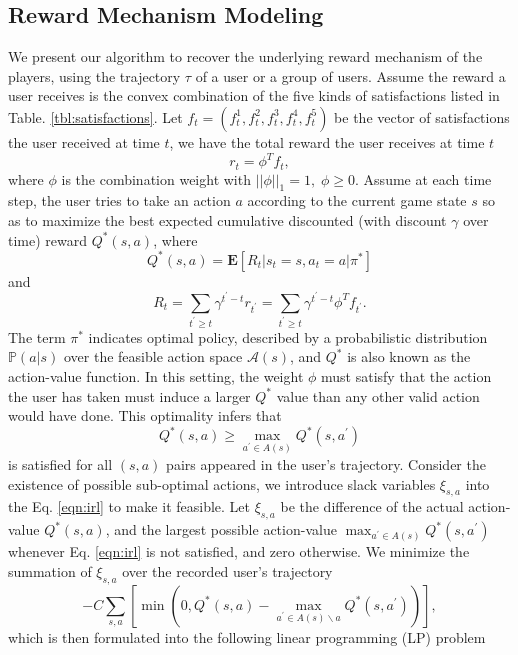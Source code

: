 \documentclass{sigchi}
\begin{document}
\subsection{Reward Mechanism Modeling}

We present our algorithm to recover the underlying reward mechanism of the players, using the trajectory $\tau$ of a user or a group of users.
Assume the reward a user receives is the convex combination of the five kinds of satisfactions listed in Table. \ref{tbl:satisfactions}.
Let $f_t=(f_t^1,f_t^2,f_t^3,f_t^4,f_t^5)$ be the vector of satisfactions the user received at time $t$, we have the total reward the user receives at time $t$
\begin{equation*}
r_t=\phi^Tf_t,
\end{equation*}
where $\phi$ is the combination weight with $||\phi||_1=1, \; \phi \geq 0$.
Assume at each time step, the user tries to take an action $a$ according to the current game state $s$ so as to maximize the best expected cumulative discounted (with discount $\gamma$ over time) reward $Q^\ast(s, a)$, where
$$Q^\ast(s,a)=\mathbf{E}[R_t | s_{t}=s, a_{t}=a | \pi^\ast]$$
and
$$R_t=\sum_{t^\prime\geq t}\gamma^{t^\prime-t}r_{t^\prime}=\sum_{t^\prime\geq t}\gamma^{t^\prime-t}\phi^Tf_{t^\prime}.$$
The term $\pi^\ast$ indicates optimal policy, described by a probabilistic distribution $\mathbb{P}(a|s)$ over the feasible action space $\mathcal{A}(s)$, and $Q^\ast$ is also known as the action-value function.
In this setting, the weight $\phi$ must satisfy that the action the user has taken must induce a larger $Q^\ast$ value than any other valid action would have done.
This optimality infers that
\begin{equation}
Q^\ast(s,a) \geq \max_{a^\prime \in A(s)}Q^\ast(s,a^\prime) \label{eqn:irl}
\end{equation}
is satisfied for all $(s,a)$ pairs appeared in the user's trajectory.
Consider the existence of possible sub-optimal actions, we introduce slack variables $\xi_{s,a}$ into the Eq. \eqref{eqn:irl} to make it feasible.
Let $\xi_{s,a}$ be the difference of the actual action-value $Q^\ast(s,a)$, and the largest possible action-value $\max_{a^\prime \in A(s)}Q^\ast(s,a^\prime)$ whenever Eq. \eqref{eqn:irl} is not satisfied, and zero otherwise.
We minimize the summation of $\xi_{s,a}$ over the recorded user's trajectory
\begin{equation}
-C\sum_{s,a} \left[\min(0, Q^\ast(s,a) - \max_{a^\prime \in A(s)\backslash a}Q^\ast(s,a^\prime))\right], \label{eqn:slack}
\end{equation}
which is then formulated into the following linear programming (LP) problem
\end{document}
